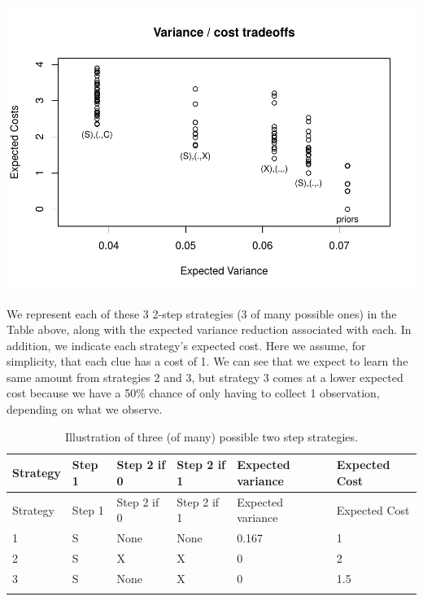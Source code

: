 \documentclass[
  12pt,
]{book}
\begin{document}
\begin{center}\includegraphics{ii_files/figure-latex/runexam-1} \end{center}

We represent each of these 3 2-step strategies (3 of many possible ones) in the Table above, along with the expected variance reduction associated with each. In addition, we indicate each strategy's expected cost. Here we assume, for simplicity, that each clue has a cost of 1. We can see that we expect to learn the same amount from strategies 2 and 3, but strategy 3 comes at a lower expected cost because we have a 50\% chance of only having to collect 1 observation, depending on what we observe.

\begin{longtable}[]{@{}llllll@{}}
\caption{Illustration of three (of many) possible two step strategies.}\tabularnewline
\toprule
Strategy & Step 1 & Step 2 if 0 & Step 2 if 1 & Expected variance & Expected Cost \\
\midrule
\endfirsthead
\toprule
Strategy & Step 1 & Step 2 if 0 & Step 2 if 1 & Expected variance & Expected Cost \\
\midrule
\endhead
1 & S & None & None & 0.167 & 1 \\
2 & S & X & X & 0 & 2 \\
3 & S & None & X & 0 & 1.5 \\
& & & & & \\
\bottomrule
\end{longtable}
\end{document}
